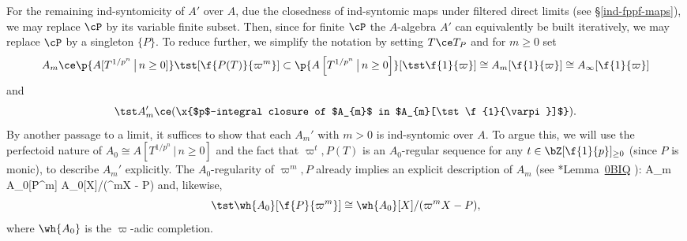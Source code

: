 For the remaining ind-syntomicity of $A'$ over $A$, due the closedness of ind-syntomic maps under filtered direct limits (see \S\ref{ind-fppf-maps}), we may replace $\cP$ by its variable finite subset. Then, since for finite $\cP$ the $A$-algebra $A'$ can equivalently be built iteratively, we may replace $\cP$ by a singleton $ \{ P \}$. To reduce further, we simplify the notation by setting $T \ce T_P$ and for $m \ge 0$ set
\[
A_{m} \ce \p{A[T^{1/p^n} \, \big\vert\, n \ge 0]}\tst [\f{P(T)}{\varpi^m}] \subset \p{A\left[T^{1/p^n} \, \big\vert\, n \ge 0 \right]}[\tst\f{1}{\varpi}] \cong A_{m}[\f{1}{\varpi}] \cong A_{\infty}[\f{1}{\varpi}]
\]
and
\[
\tst A'_m \ce (\x{$p$-integral closure of $A_{m}$ in $A_{m}[\tst \f{1}{\varpi}]$}).
\]
By another passage to a limit, it suffices to show that each $A_m'$ with $m > 0$ is ind-syntomic over $A$. To argue this, we will use the perfectoid nature of $A_0 \cong A\left[T^{1/p^n} \, \big\vert\, n \ge 0 \right]$ and the fact that $\varpi^t, P(T)$ is an $A_0$-regular sequence for any $t \in \bZ[\f{1}{p}]_{\ge 0}$ (since $P$ is monic),  to describe $A_m'$ explicitly. The $A_0$-regularity of $\varpi^m, P$ already implies an explicit description of $A_m$ (see \cite{SP}*{Lemma~\href{https://stacks.math.columbia.edu/tag/0BIQ}{0BIQ}}%
):
\be \label{exp-blowup}
\tst A_m \cong A_0[\f{P}{\varpi^m}] \cong A_0[X]/(\varpi^mX - P)
\ee
and, likewise,
\[
\tst\wh{A_0}[\f{P}{\varpi^m}] \cong \wh{A_0}[X]/(\varpi^m X - P),
\]
where $\wh{A_0}$ is the $\varpi$-adic completion.

